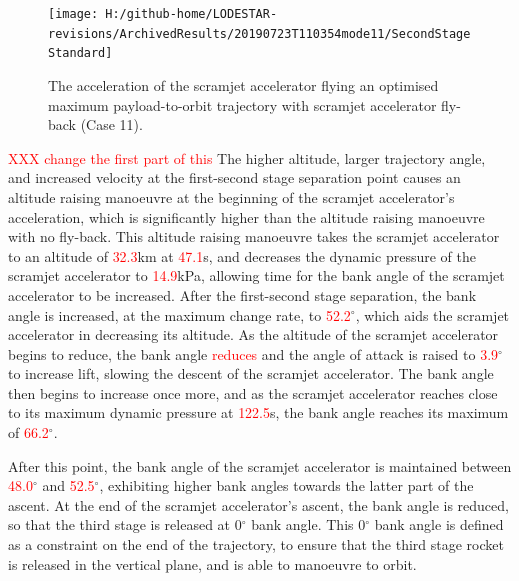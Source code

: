   \begin{figure}[!ht] %
  	\centering
  	\texttt{[image: H:/github-home/LODESTAR-revisions/ArchivedResults/20190723T110354mode11/SecondStageStandard]}
  	\caption{The acceleration of the scramjet accelerator flying an optimised maximum payload-to-orbit trajectory with scramjet accelerator fly-back (Case 11). }
  	\label{fig:SecondStageStandard}
  \end{figure}
  \textcolor{red}{XXX change the first part of this}
 The higher altitude, larger trajectory angle, and increased velocity at the first-second stage separation point causes an altitude raising manoeuvre at the beginning of the scramjet accelerator's acceleration, which is significantly higher than the altitude raising manoeuvre with no fly-back. This altitude raising manoeuvre takes the scramjet accelerator to an altitude of \textcolor{red}{32.3}km at \textcolor{red}{47.1}s, and decreases the dynamic pressure of the scramjet accelerator to \textcolor{red}{14.9}kPa, allowing time for the bank angle of the scramjet accelerator to be increased. 
 After the first-second stage separation, the bank angle is increased, at the maximum change rate, to \textcolor{red}{52.2}$^\circ$, which aids the scramjet accelerator in decreasing its altitude. As the altitude of the scramjet accelerator begins to reduce, the bank angle \textcolor{red}{reduces} and the angle of attack is raised to \textcolor{red}{3.9}$^\circ$ to increase lift, slowing the descent of the scramjet accelerator. 
 The bank angle then begins to increase once more, and as the scramjet accelerator reaches close to its maximum dynamic pressure at \textcolor{red}{122.5}s, the bank angle reaches its maximum of \textcolor{red}{66.2}$^\circ$. 

After this point, the bank angle of the scramjet accelerator is maintained between \textcolor{red}{48.0}$^\circ$ and \textcolor{red}{52.5}$^\circ$, exhibiting higher bank angles towards the latter part of the ascent. At the end of the scramjet accelerator's ascent, the bank angle is reduced, so that the third stage is released at 0$^\circ$ bank angle. This 0$^\circ$ bank angle is defined as a constraint on the end of the trajectory, to ensure that the third stage rocket is released in the vertical plane, and is able to manoeuvre to orbit. 


